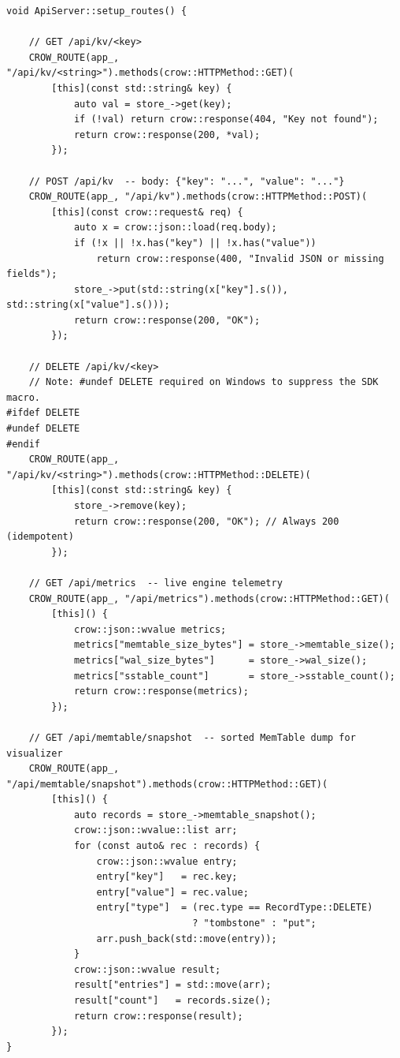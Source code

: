 \documentclass[11pt,a4paper]{article}
\begin{document}
\begin{lstlisting}[style=cpp, caption={REST API Route Definitions: \texttt{src/api\_routes.cpp}}]
void ApiServer::setup_routes() {

    // GET /api/kv/<key>
    CROW_ROUTE(app_, "/api/kv/<string>").methods(crow::HTTPMethod::GET)(
        [this](const std::string& key) {
            auto val = store_->get(key);
            if (!val) return crow::response(404, "Key not found");
            return crow::response(200, *val);
        });

    // POST /api/kv  -- body: {"key": "...", "value": "..."}
    CROW_ROUTE(app_, "/api/kv").methods(crow::HTTPMethod::POST)(
        [this](const crow::request& req) {
            auto x = crow::json::load(req.body);
            if (!x || !x.has("key") || !x.has("value"))
                return crow::response(400, "Invalid JSON or missing fields");
            store_->put(std::string(x["key"].s()), std::string(x["value"].s()));
            return crow::response(200, "OK");
        });

    // DELETE /api/kv/<key>
    // Note: #undef DELETE required on Windows to suppress the SDK macro.
#ifdef DELETE
#undef DELETE
#endif
    CROW_ROUTE(app_, "/api/kv/<string>").methods(crow::HTTPMethod::DELETE)(
        [this](const std::string& key) {
            store_->remove(key);
            return crow::response(200, "OK"); // Always 200 (idempotent)
        });

    // GET /api/metrics  -- live engine telemetry
    CROW_ROUTE(app_, "/api/metrics").methods(crow::HTTPMethod::GET)(
        [this]() {
            crow::json::wvalue metrics;
            metrics["memtable_size_bytes"] = store_->memtable_size();
            metrics["wal_size_bytes"]      = store_->wal_size();
            metrics["sstable_count"]       = store_->sstable_count();
            return crow::response(metrics);
        });

    // GET /api/memtable/snapshot  -- sorted MemTable dump for visualizer
    CROW_ROUTE(app_, "/api/memtable/snapshot").methods(crow::HTTPMethod::GET)(
        [this]() {
            auto records = store_->memtable_snapshot();
            crow::json::wvalue::list arr;
            for (const auto& rec : records) {
                crow::json::wvalue entry;
                entry["key"]   = rec.key;
                entry["value"] = rec.value;
                entry["type"]  = (rec.type == RecordType::DELETE)
                                 ? "tombstone" : "put";
                arr.push_back(std::move(entry));
            }
            crow::json::wvalue result;
            result["entries"] = std::move(arr);
            result["count"]   = records.size();
            return crow::response(result);
        });
}
\end{lstlisting}
\end{document}

